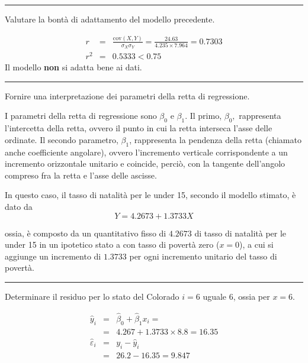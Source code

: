 \documentclass[
  11pt,
]{book}
\theoremstyle{mytheoremstyle}
\theoremstyle{mydefstyle}
\newenvironment{sol}
  {
  \begin{tcolorbox}[enhanced,breakable,arc=0.1mm,boxrule=1pt,colback=white,colframe=iblue,
  title=\bf \fontfamily{lmss}\selectfont \hspace{.5 cm} Soluzione,drop fuzzy shadow]

}{
\end{tcolorbox}
  }
\begin{document}
\begin{center}\rule{0.5\linewidth}{0.5pt}\end{center}

Valutare la bontà di adattamento del modello precedente.

\begin{sol}
\begin{eqnarray*}
r&=&\frac{\text{cov}(X,Y)}{\sigma_X\sigma_Y}=\frac{ 24.63 }{ 4.235 \times 7.964 }= 0.7303 \\r^2&=& 0.5333 < 0.75
\end{eqnarray*}
Il modello \textbf{non} si adatta bene ai dati.

\end{sol}

\begin{center}\rule{0.5\linewidth}{0.5pt}\end{center}

Fornire una interpretazione dei parametri della retta di regressione.

\begin{sol}
I parametri della retta di regressione sono \(\beta_{0}\) e \(\beta_{1}\).
Il primo, \(\beta_{0},\) rappresenta l'intercetta della retta,
ovvero il punto in cui la retta interseca l'asse delle ordinate.
Il secondo parametro, \(\beta_{1}\), rappresenta la pendenza della
retta (chiamato anche coefficiente angolare), ovvero l'incremento
verticale corrispondente a un incremento orizzontale unitario e
coincide, perciò, con la tangente dell'angolo compreso fra la
retta e l'asse delle ascisse.

In questo caso, il tasso di natalità per le under 15,
secondo il modello stimato, è dato da
\[Y= 4.2673 + 1.3733 X\]

ossia, è composto da un quantitativo fisso di \(4.2673\) di tasso di natalità per le under 15 in un ipotetico stato a con tasso di povertà zero (\(x=0\)), a cui si aggiunge un incremento di \(1.3733\) per ogni incremento unitario del tasso di povertà.

\end{sol}

\begin{center}\rule{0.5\linewidth}{0.5pt}\end{center}

Determinare il residuo per lo stato del Colorado \(i=6\)
uguale 6, ossia per \(x=6\).

\begin{sol}
\begin{eqnarray*}
\hat y_i &=&\hat\beta_0+\hat\beta_1 x_i=\\ 
&=& 4.267 + 1.3733 \times 8.8 = 16.35 \\ 
\hat \varepsilon_i &=& y_i-\hat y_i\\ 
&=& 26.2 - 16.35 = 9.847  
\end{eqnarray*}

\end{sol}
\end{document}
